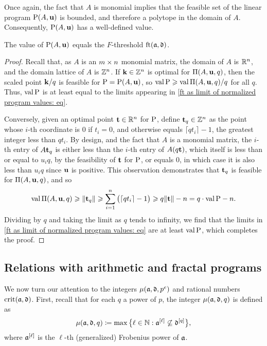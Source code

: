\documentclass{amsart}
\begin{document}
Once again, the fact that $A$ is monomial implies that the feasible set of the linear program $\mathrm{P}(A,\mathbf{u})$ is bounded, and therefore a polytope in the domain of $A$.  Consequently, $\mathrm{P}(A,\mathbf{u})$ has a well-defined value.

\begin{proposition}
\label{ft as val LP: P}
The value of $\mathrm{P}(A, \mathbf{u})$ equals the $F$-threshold $\operatorname{ft}(\mathfrak{a}, \mathfrak{d})$.
\end{proposition}

\begin{proof}
  Recall that, as $A$ is an $m \times n$ monomial matrix, the domain of $A$ is $\mathbb{R}^n$, and the domain lattice of $A$ is $\mathbb{Z}^n$.  If $\mathbf{k} \in \mathbb{Z}^n$ is optimal for $\Pi(A,\mathbf{u},q)$, then the scaled point $\mathbf{k}/q$ is feasible for $\mathrm{P} = \mathrm{P}(A, \mathbf{u})$, so $\operatorname{val} \mathrm{P} \geqslant \operatorname{val} \Pi(A, \mathbf{u}, q)/q$ for all $q$.
   Thus, $\operatorname{val} \mathrm{P}$ is at least equal to the limits appearing in \eqref{ft as limit of normalized program values: eq}.

   Conversely, given an optimal point $\mathbf{t} \in \mathbb{R}^n$ for $\mathrm{P}$,
   define $\mathbf{t}_q \in \mathbb{Z}^n$ as the point whose $i$-th coordinate is $0$ if $t_i=0$, and otherwise equals $\lceil q t_i \rceil - 1$, the greatest integer less than $q t_i$.
   By design, and the fact that $A$ is a monomial matrix, the $i$-th entry of $A \mathbf{t}_q$ is either less than the $i$-th entry of $A (q \mathbf{t})$, which itself is less than or equal to $u_iq$, by the feasibility of $\mathbf{t}$ for $\mathrm{P}$, or equals $0$,  in which case it is also less than $u_i q$ since $\mathbf{u}$ is positive. This observation demonstrates that $\mathbf{t}_q$ is feasible for $\Pi(A, \mathbf{u}, q)$, and so
   \[\operatorname{val} \Pi(A, \mathbf{u}, q) \geqslant \| \mathbf{t}_q \| \geqslant \sum_{i=1}^n \big(\lceil q t_i \rceil - 1\big) \geqslant q \| \mathbf{t} \| -n = q \cdot \operatorname{val} \mathrm{P} - n.\]
   Dividing by $q$ and taking the limit as $q$ tends to infinity, we find that the limits in \eqref{ft as limit of normalized program values: eq} are at least $\operatorname{val} \mathrm{P}$, which completes the proof.
\end{proof}

\subsection{Relations with arithmetic and fractal programs}

We now turn our attention to the integers $\mu(\mathfrak{a}, \mathfrak{d}, p^e)$ and rational numbers $\operatorname{crit}(\mathfrak{a},\mathfrak{d})$.
First, recall that for each $q$ a power of $p$, the integer $\mu(\mathfrak{a}, \mathfrak{d}, q)$ is defined as
\[\mu(\mathfrak{a},\mathfrak{d},q) \coloneqq \max\big\{ \ell \in \mathbb{N} : \mathfrak{a}^{[\ell]} \not\subseteq \mathfrak{d}^{[q]}\big\},\]
where $\mathfrak{a}^{[\ell]}$ is the $\ell$-th (generalized) Frobenius power of $\mathfrak{a}$.
\end{document}
